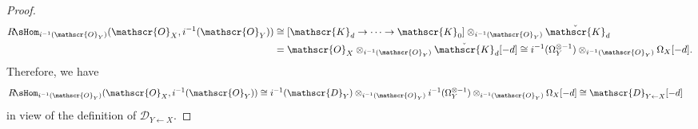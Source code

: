 \begin{proof}
\begin{align*}
R\!\sHom_{i^{-1}(\mathscr{O}_Y)}(\mathscr{O}_X,i^{-1}(\mathscr{O}_Y))&\cong [\mathscr{K}_d\to\cdots\to \mathscr{K}_0]\otimes_{i^{-1}(\mathscr{O}_Y)}\check{\mathscr{K}}_d\\
&=\mathscr{O}_X\otimes_{i^{-1}(\mathscr{O}_Y)}\check{\mathscr{K}}_d[-d]\cong i^{-1}(\Omega_Y^{\otimes-1})\otimes_{i^{-1}(\mathscr{O}_Y)}\Omega_X[-d].
\end{align*}
Therefore, we have
\begin{align*}
R\!\sHom_{i^{-1}(\mathscr{O}_Y)}(\mathscr{O}_X,i^{-1}(\mathscr{O}_Y))&\cong i^{-1}(\mathscr{D}_Y)\otimes_{i^{-1}(\mathscr{O}_Y)}i^{-1}(\Omega_Y^{\otimes-1})\otimes_{i^{-1}(\mathscr{O}_Y)}\Omega_X[-d]\cong \mathscr{D}_{Y\leftarrow X}[-d]
\end{align*}
in view of the definition of $\mathscr{D}_{Y\leftarrow X}$.
\end{proof}

